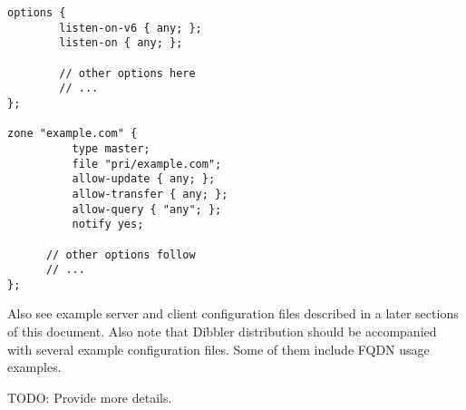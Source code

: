 \begin{verbatim}
options {
        listen-on-v6 { any; };
        listen-on { any; };

        // other options here
        // ...
};

zone "example.com" {
          type master;
          file "pri/example.com";
          allow-update { any; };
          allow-transfer { any; };
          allow-query { "any"; };
          notify yes;

      // other options follow
      // ...
};

\end{verbatim}

Also see example server and client configuration files described in a
later sections of this document. Also note that Dibbler distribution
should be accompanied with several example configuration files. Some
of them include FQDN usage examples.

TODO: Provide more details.